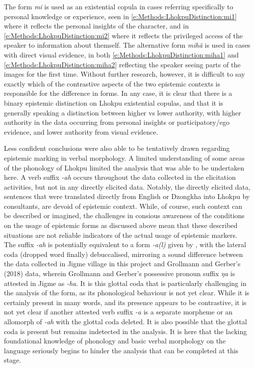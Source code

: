 The form \textit{mi} is used as an existential copula in cases referring specifically to personal knowledge or experience, seen in \ref{e:Methods:LhokpuDistinction:mi1} where it reflects the personal insights of the character, and in \ref{e:Methods:LhokpuDistinction:mi2} where it reflects the privileged access of the speaker to information about themself. The alternative form \textit{mihã} is used in cases with direct visual evidence, in both \ref{e:Methods:LhokpuDistinction:miha1} and \ref{e:Methods:LhokpuDistinction:miha2} reflecting the speaker seeing parts of the images for the first time. Without further research, however, it is difficult to say exactly which of the contrastive aspects of the two epistemic contexts is responsible for the difference in forms. In any case, it is clear that there is a binary epistemic distinction on Lhokpu existential copulas, and that it is generally speaking a distinction between higher vs lower authority, with higher authority in the data occurring from personal insights or participatory/ego evidence, and lower authority from visual evidence.

Less confident conclusions were also able to be tentatively drawn regarding epistemic marking in verbal morphology. A limited understanding of some areas of the phonology of Lhokpu limited the analysis that was able to be undertaken here. A verb suffix \textit{-ah} occurs throughout the data collected in the elicitation activities, but not in any directly elicited data. Notably, the directly elicited data, sentences that were translated directly from English or Dzongkha into Lhokpu by consultants, are devoid of epistemic context. While, of course, such context can be described or imagined, the challenges in consious awareness of the conditions on the usage of epistemic forms as discussed above mean that these described situations are not reliable indicators of the actual usage of epistemic markers. The suffix \textit{-ah} is potentially equivalent to a form \textit{-a(l)} given by \cite{Grollmann2018}, with the lateral coda (dropped word finally) debuccalised, mirroring a sound difference between the data collected in Jigme village in this project and Grollmann and Gerber's (2018) data, wherein Grollmann and Gerber's possessive pronoun suffix \textit{ŋa} is attested in Jigme as \textit{-ha}. It is this glottal coda that is particularly challenging in the analysis of the form, as its phonological behaviour is not yet clear. While it is certainly present in many words, and its presence appears to be contrastive, it is not yet clear if another attested verb suffix \textit{-a} is a separate morpheme or an allomorph of \textit{-ah} with the glottal coda deleted. It is also possible that the glottal coda is present but remains indetected in the analysis. It is here that the lacking foundational knowledge of phonology and basic verbal morphology on the language seriously begins to hinder the analysis that can be completed at this stage.

